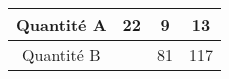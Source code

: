 \begin{tabular}{|c|c|c|c|}
\hline
Quantité A & 22 & 9 & 13 \\ \hline
Quantité B & \kern1cm & 81 & 117 \\ \hline
\end{tabular}

